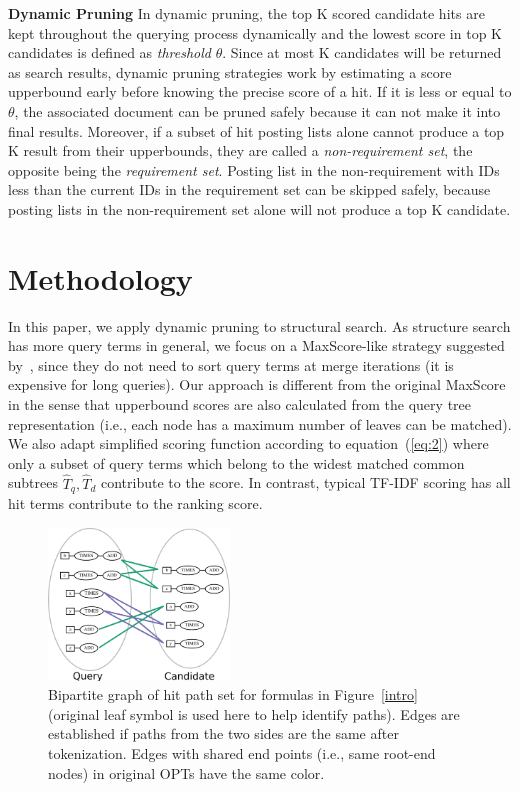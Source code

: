 \documentclass[runningheads]{llncs}
\begin{document}
\vspace{0.1in}
\noindent\textbf{Dynamic Pruning}\; In dynamic pruning, the top K scored candidate hits are kept throughout the querying process dynamically and the lowest score in top K candidates is defined as \textit{threshold} $\theta$. Since at most K candidates will be returned as search results, dynamic pruning strategies work by estimating a score upperbound early before knowing the precise score of a hit.
%
If it is less or equal to $\theta$, the associated document can be pruned safely because it can not make it into final results.
Moreover, if a subset of hit posting lists alone cannot produce a top K result from their upperbounds, they are called a \textit{non-requirement set}, the opposite being the \textit{requirement set}.
%
Posting list in the non-requirement with IDs less than the current IDs in the requirement set can be skipped safely, because posting lists in the non-requirement set alone will not produce a top K candidate.

\section{Methodology}
\label{strategy}
In this paper, we apply dynamic pruning to structural search.
As structure search has more query terms in general, we focus on a MaxScore-like strategy suggested by~\cite{Shandongdong2012, antonio2019}, since they do not need to sort query terms at merge iterations (it is expensive for long queries).
%
Our approach is different from the original MaxScore in the sense that upperbound scores are also calculated from the query tree representation (i.e., each node has a maximum number of leaves can be matched).
We also adapt simplified scoring function according to equation~(\ref{eq:2})
where only a subset of query terms which belong to the widest matched common subtrees $\hat{T}_q, \hat{T}_d$ contribute to the score.
In contrast, typical TF-IDF scoring has all hit terms contribute to the ranking score.

\begin{figure}[!t]
\begin{center}
\includegraphics[width=1.90in]{fig/bipartile.eps}
\caption{Bipartite graph of hit path set for formulas in Figure~\ref{intro} (original leaf symbol is used here to help identify paths). Edges are established if paths from the two sides are the same after tokenization. Edges with shared end points (i.e., same root-end nodes) in original OPTs have the same color. }
\label{bipart}
\end{center}
\end{figure}
\end{document}

